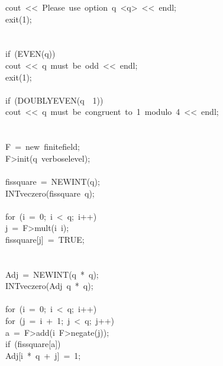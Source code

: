 \begin{tabbing}
\>\>cout\ <<\ Please\ use\ option\ q\ <q>\ <<\ endl;\\[0pt]
\>\>exit(1);\\[0pt]
\>\>\\[0pt]
\\[0pt]
\>if\ (EVEN(q))\ \\[0pt]
\>\>cout\ <<\ q\ must\ be\ odd\ <<\ endl;\\[0pt]
\>\>exit(1);\\[0pt]
\>\>\\[0pt]
\>if\ (DOUBLYEVEN(q\ \ 1))\ \\[0pt]
\>\>cout\ <<\ q\ must\ be\ congruent\ to\ 1\ modulo\ 4\ <<\ endl;\\[0pt]
\>\>\\[0pt]
\>\\[0pt]
\>F\ =\ new\ finitefield;\\[0pt]
\>F>init(q\ verboselevel);\\[0pt]
\\[0pt]
\>fissquare\ =\ NEWINT(q);\\[0pt]
\>INTveczero(fissquare\ q);\\[0pt]
\>\\[0pt]
\>for\ (i\ =\ 0;\ i\ <\ q;\ i++)\ \\[0pt]
\>\>j\ =\ F>mult(i\ i);\\[0pt]
\>\>fissquare[j]\ =\ TRUE;\\[0pt]
\>\>\\[0pt]
\\[0pt]
\>Adj\ =\ NEWINT(q\ *\ q);\\[0pt]
\>INTveczero(Adj\ q\ *\ q);\\[0pt]
\>\\[0pt]
\>for\ (i\ =\ 0;\ i\ <\ q;\ i++)\ \\[0pt]
\>\>for\ (j\ =\ i\ +\ 1;\ j\ <\ q;\ j++)\ \\[0pt]
\>\>\>a\ =\ F>add(i\ F>negate(j));\\[0pt]
\>\>\>if\ (fissquare[a])\ \\[0pt]
\>\>\>\>Adj[i\ *\ q\ +\ j]\ =\ 1;\\[0pt]

\end{tabbing}
